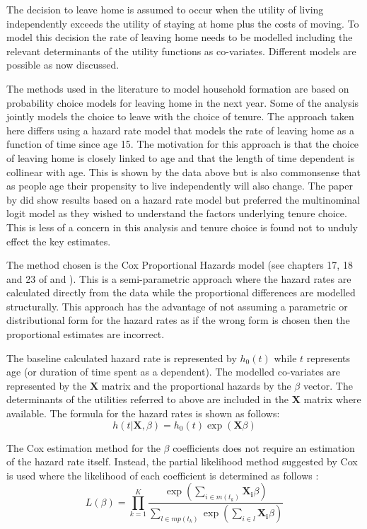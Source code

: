 \documentclass[12pt]{article}
\begin{document}
The decision to leave home is assumed to occur when the utility of living independently exceeds the utility of staying at home plus the costs of moving. To model this decision the rate of leaving home needs to be modelled including the relevant determinants of the utility functions as co-variates. Different models are possible as now discussed.

The methods used in the literature to model household formation are based on probability choice models for leaving home in the next year. Some of the analysis jointly models the choice to leave with the choice of tenure. The approach taken here differs using a hazard rate model that models the rate of leaving home as a function of time since age 15. The motivation for this approach is that the choice of leaving home is closely linked to age and that the length of time dependent is collinear with age. This is shown by the data above but is also commonsense that as people age their propensity to live independently will also change. The paper by \cite{lee2013happens} did show results based on a hazard rate model but preferred the multinominal logit model as they wished to understand the factors underlying tenure choice. This is less of a concern in this analysis and tenure choice is found not to unduly effect the key estimates.

The method chosen is the Cox Proportional Hazards model (see chapters 17, 18 and 23 of \cite{cameron2005microeconometrics} and \cite{brostrom2012event}). This is a semi-parametric approach where the hazard rates are calculated directly from the data while the proportional differences are modelled structurally. This approach has the advantage of not assuming a parametric or distributional form for the hazard rates as if the wrong form is chosen then the proportional estimates are incorrect.

The baseline calculated hazard rate is represented by $h_0(t)$ while $t$ represents age (or  duration of time spent as a dependent). The modelled co-variates are represented by the $\mathbf{X}$ matrix and the proportional hazards by the $\beta$ vector. The determinants of the utilities referred to above are included in the $\mathbf{X}$ matrix where available. The formula for the hazard rates is shown as follows:
\[h(t|\mathbf{X}, \beta) = h_0( t ) \exp ( \mathbf{X}  \beta )\]

The Cox estimation method for the $\beta$ coefficients does not require an estimation of the hazard rate itself. Instead, the partial likelihood method suggested by Cox is used where the likelihood of each coefficient is determined as follows \parencite{cox1972regression}:
\[ L(\beta) = \prod_{k = 1}^{K} \frac{\exp ( \sum_{i \in m(t_k)}\mathbf{ X_i}  \beta )}{\sum_{l \in mp(t_k)}\exp ( \sum_{i \in l}\mathbf{X_i}  \beta ) }  \]
\end{document}
